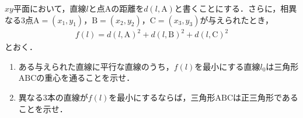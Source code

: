 \documentclass[../../main.tex]{subfiles}
\begin{document}
$xy$平面において，直線$l$と点$\mathrm{A}$の距離を$d(l,\mathrm{A})$と書くことにする．さらに，相異なる$3$点$\mathrm{A}=(x_1,y_1)$，$\mathrm{B}=(x_2,y_2)$，$\mathrm{C}=(x_3,y_3)$が与えられたとき，
\begin{align*}
  f(l)=d(l,\mathrm{A})^2+d(l,\mathrm{B})^2+d(l,\mathrm{C})^2
\end{align*}
とおく．

\begin{enumerate}
  \item ある与えられた直線に平行な直線のうち，$f(l)$を最小にする直線$l_0$は三角形$\mathrm{ABC}$の重心を通ることを示せ．
  \item 異なる$3$本の直線が$f(l)$を最小にするならば，三角形$\mathrm{ABC}$は正三角形であることを示せ．
\end{enumerate}
\end{document}
